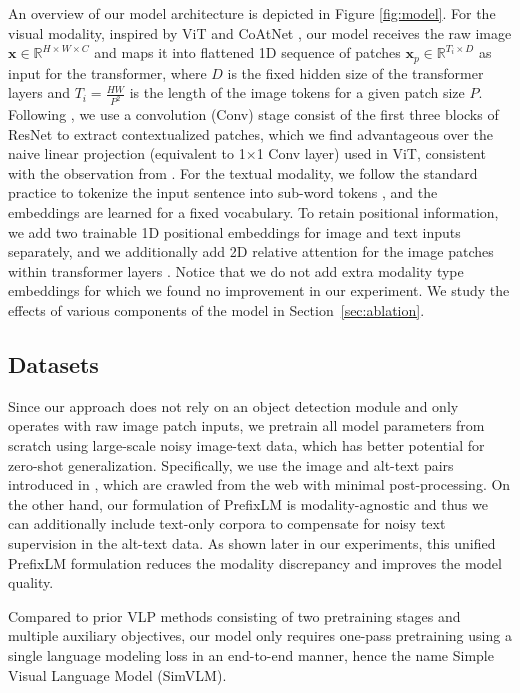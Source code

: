 An overview of our model architecture is depicted in Figure \ref{fig:model}.
For the visual modality, inspired by ViT \citep{dosovitskiy2021an} and CoAtNet \citep{dai2021coatnet}, our model receives the raw image $\textbf{x} \in \mathbb{R}^{H \times W \times C}$ and maps it into flattened 1D sequence of patches $\textbf{x}_p \in \mathbb{R}^{T_i \times D}$ as input for the transformer, where $D$ is the fixed hidden size of the transformer layers and $T_i = \frac{HW}{P^2}$
is the length of the image tokens for a given patch size $P$. Following \cite{dai2021coatnet}, we use a convolution (Conv) stage consist of the first three blocks of ResNet \citep{he2016deep} to extract contextualized patches, which we find advantageous over the naive linear projection (equivalent to 1$\times$1 Conv layer) used in ViT, consistent with the observation from \citep{xiao2021early}. For the textual modality, we follow the standard practice to tokenize the input sentence into sub-word tokens \citep{kudo2018sentencepiece}, and the embeddings are learned for a fixed vocabulary. To retain positional information, we add two trainable 1D positional embeddings for image and text inputs separately, and we additionally add 2D relative attention for the image patches within transformer layers \citep{dai2021coatnet}. Notice that we do not add extra modality type embeddings for which we found no improvement in our experiment. We study the effects of various components of the model in Section~\ref{sec:ablation}.

\subsection{Datasets}

Since our approach does not rely on an object detection module and only operates with raw image patch inputs, we pretrain all model parameters from scratch using large-scale noisy image-text data, which has better potential for zero-shot generalization. Specifically, we use the image and alt-text pairs introduced in \cite{jia2021scaling}, which are crawled from the web with minimal post-processing. On the other hand, our formulation of PrefixLM is modality-agnostic and thus we can additionally include text-only corpora to compensate for noisy text supervision in the alt-text data. As shown later in our experiments, this unified PrefixLM formulation reduces the modality discrepancy and improves the model quality.

Compared to prior VLP methods consisting of two pretraining stages and multiple auxiliary objectives, our model only requires one-pass pretraining using a single language modeling loss in an end-to-end manner, hence the name Simple Visual Language Model (SimVLM).

